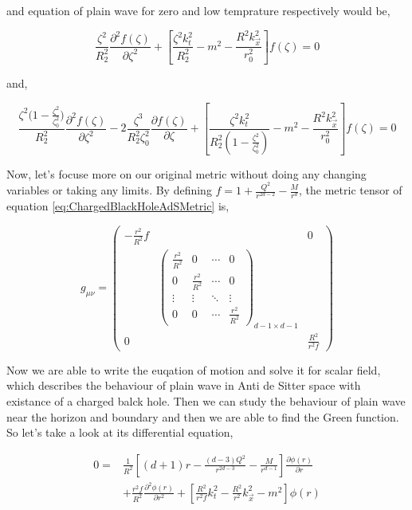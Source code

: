 and equation of plain wave for zero and low temprature respectively would be,

\begin{equation}
    \frac{\zeta^2}{R^2_2}\frac{\partial^2 f(\zeta)}{\partial\zeta^2} + \left[\frac{\zeta^2k^2_t}{R^2_2} - m^2 - \frac{R^2k^2_{\vec{x}}}{r^2_0} \right] f(\zeta) = 0
\end{equation}

and,

\begin{equation}
    \frac{\zeta^2\big(1-\frac{\zeta^2}{\zeta^2_0}\big)}{R^2_2}\frac{\partial^2 f(\zeta)}{\partial\zeta^2} - 2\frac{\zeta^3}{R^2_2 \zeta^2_0}\frac{\partial f(\zeta)}{\partial\zeta} + \left[ \frac{\zeta^2k^2_t}{R^2_2(1-\frac{\zeta^2}{\zeta^2_0})} - m^2 - \frac{R^2k^2_{\vec{x}}}{r^2_0} \right] f(\zeta) = 0
\end{equation}

Now, let's focuse more on our original metric without doing any changing variables or taking any limits. By defining $f = 1+\frac{Q^2}{r^{2d-2}}-\frac{M}{r^d}$, the metric tensor of equation \ref{eq:ChargedBlackHoleAdSMetric} is,

\begin{equation} \label{eq:ChargedBlackHoleAdSLowT_metrictensor}
    g_{\mu\nu} = 
    \begin{pmatrix}
        -\frac{r^2}{R^2}f & & 0 \\
        & \begin{pmatrix}
            \frac{r^2}{R^2} & 0 & \cdots & 0 \\
            0 & \frac{r^2}{R^2} & \cdots & 0 \\
            \vdots  & \vdots  & \ddots & \vdots  \\
            0 & 0 & \cdots & \frac{r^2}{R^2}
        \end{pmatrix}_{d-1 \times d-1}
        &\\
        0 & & \frac{R^2}{r^2f} 
    \end{pmatrix}
\end{equation}

Now we are able to write the euqation of motion and solve it for scalar field, which describes the behaviour of plain wave in Anti de Sitter space with existance of a charged balck hole. Then we can study the behaviour of plain wave near the horizon and boundary and then we are able to find the Green function. So let's take a look at its differential equation,

\begin{align} \label{eq:equationofmotionchargeblackholeinads}
    0 =& \frac{1}{R^2}\left[(d+1)r - \frac{(d-3)Q^2}{r^{2d-3}} - \frac{M}{r^{d-1}} \right]\frac{\partial \phi(r)}{\partial r} \nonumber\\ 
      &+ \frac{r^2f}{R^2}\frac{\partial^2\phi(r)}{\partial r^2} + \left[ \frac{R^2}{r^2f}k^2_t-\frac{R^2}{r^2}k^2_{\vec{x}}-m^2\right]\phi(r)
\end{align} 

